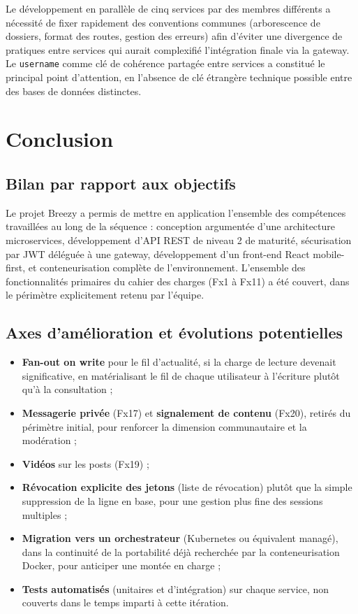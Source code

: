 \documentclass{cesi}
\begin{document}
Le développement en parallèle de cinq services par des membres différents a
nécessité de fixer rapidement des conventions communes (arborescence de dossiers,
format des routes, gestion des erreurs) afin d'éviter une divergence de pratiques
entre services qui aurait complexifié l'intégration finale via la gateway. Le
\texttt{username} comme clé de cohérence partagée entre services a constitué le
principal point d'attention, en l'absence de clé étrangère technique possible entre
des bases de données distinctes.

\newpage
\section{Conclusion}

\subsection{Bilan par rapport aux objectifs}

Le projet Breezy a permis de mettre en application l'ensemble des compétences
travaillées au long de la séquence : conception argumentée d'une architecture
microservices, développement d'API REST de niveau 2 de maturité, sécurisation par
JWT déléguée à une gateway, développement d'un front-end React mobile-first, et
conteneurisation complète de l'environnement. L'ensemble des fonctionnalités
primaires du cahier des charges (Fx1 à Fx11) a été couvert, dans le périmètre
explicitement retenu par l'équipe.

\subsection{Axes d'amélioration et évolutions potentielles}

\begin{itemize}
  \item \textbf{Fan-out on write} pour le fil d'actualité, si la charge de lecture
        devenait significative, en matérialisant le fil de chaque utilisateur à
        l'écriture plutôt qu'à la consultation ;
  \item \textbf{Messagerie privée} (Fx17) et \textbf{signalement de contenu} (Fx20),
        retirés du périmètre initial, pour renforcer la dimension communautaire et
        la modération ;
  \item \textbf{Vidéos} sur les posts (Fx19) ;
  \item \textbf{Révocation explicite des jetons} (liste de révocation) plutôt que la
        simple suppression de la ligne en base, pour une gestion plus fine des
        sessions multiples ;
  \item \textbf{Migration vers un orchestrateur} (Kubernetes ou équivalent managé),
        dans la continuité de la portabilité déjà recherchée par la conteneurisation
        Docker, pour anticiper une montée en charge ;
  \item \textbf{Tests automatisés} (unitaires et d'intégration) sur chaque service,
        non couverts dans le temps imparti à cette itération.
\end{itemize}
\end{document}
